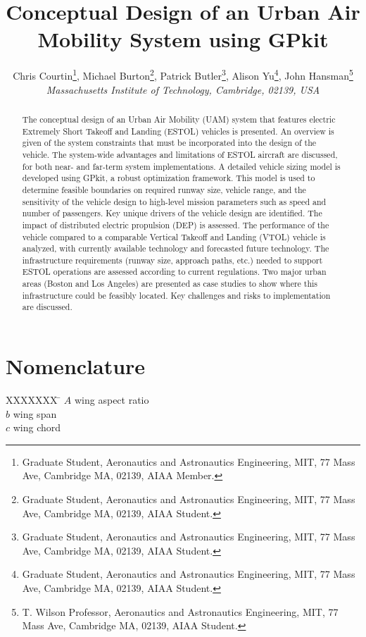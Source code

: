 \documentclass[]{aiaa-tc}%
\title{Conceptual Design of an Urban Air Mobility System using GPkit}
\author{
  Chris Courtin\thanks{Graduate Student, Aeronautics and Astronautics Engineering, MIT, 77 Mass Ave, Cambridge MA, 02139, AIAA Member.}, 
  Michael Burton\thanks{Graduate Student, Aeronautics and Astronautics Engineering, MIT, 77 Mass Ave, Cambridge MA, 02139, AIAA Student.}, 
  Patrick Butler\thanks{Graduate Student, Aeronautics and Astronautics Engineering, MIT, 77 Mass Ave, Cambridge MA, 02139, AIAA Student.}, 
  Alison Yu\thanks{Graduate Student, Aeronautics and Astronautics Engineering, MIT, 77 Mass Ave, Cambridge MA, 02139, AIAA Student.}, 
  John Hansman\thanks{T. Wilson Professor, Aeronautics and Astronautics Engineering, MIT, 77 Mass Ave, Cambridge MA, 02139, AIAA Student.} \\
  {\normalsize\itshape
   Massachusetts Institute of Technology, Cambridge, 02139, USA}\\
 }
\begin{document}
\graphicspath{{./figs/}} 
\maketitle

\begin{abstract}
    The conceptual design of an Urban Air Mobility (UAM) system that features electric Extremely Short Takeoff and Landing (ESTOL) vehicles is presented.  An overview is given of the system constraints that must be incorporated into the design of the vehicle.  The system-wide advantages and limitations of ESTOL aircraft are discussed, for both near- and far-term system implementations.  A detailed vehicle sizing model is developed using GPkit, a robust optimization framework.  This model is used to determine feasible boundaries on required runway size, vehicle range, and the sensitivity of the vehicle design to high-level mission parameters such as speed and number of passengers.  Key unique drivers of the vehicle design are identified.  The impact of distributed electric propulsion (DEP) is assessed.  The performance of the vehicle compared to a comparable Vertical Takeoff and Landing (VTOL) vehicle is analyzed, with currently available technology and forecasted future technology.   The infrastructure requirements (runway size, approach paths, etc.) needed to support ESTOL operations are assessed according to current regulations.  Two major urban areas (Boston and Los Angeles) are presented as case studies to show where this infrastructure could be feasibly located.  Key challenges and risks to implementation are discussed.  


\end{abstract}

\section*{Nomenclature}

\begin{multicols}{2}
\small

\begin{tabbing}
  XXXXXXX \= \kill%
$A$ \> wing aspect ratio \\
$b$ \> wing span \\ %
$c$ \> wing chord \\ %
 \end{tabbing}

\end{multicols}
\end{document}
